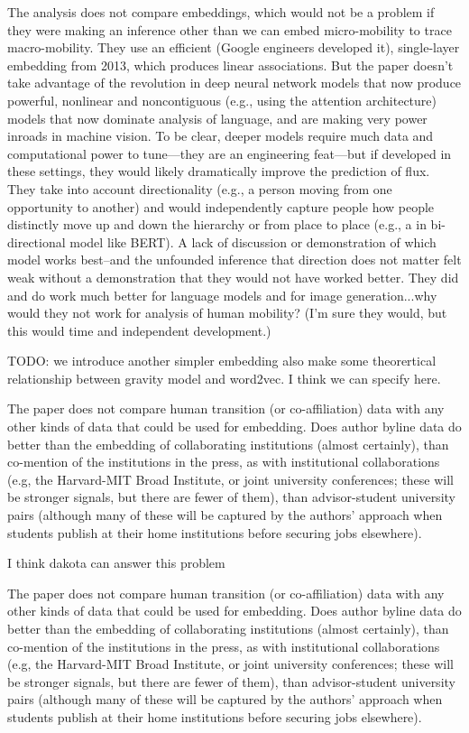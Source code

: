 \documentclass[12pt,a4paper]{article}
\newcommand{\response}[1]{{\leavevmode\noindent #1}}
\newcommand{\rcomment}[1]{%
\vspace{10pt}
\begin{tcolorbox}[colback=black!3,colframe=white!45!black]
#1
\end{tcolorbox}
}
\begin{document}
\rcomment{
The analysis does not compare embeddings, which would not be a problem if they were making
an inference other than we can embed micro-mobility to trace macro-mobility. They use an
efficient (Google engineers developed it), single-layer embedding from 2013, which produces
linear associations. But the paper doesn’t take advantage of the revolution in deep neural
network models that now produce powerful, nonlinear and noncontiguous (e.g., using the
attention architecture) models that now dominate analysis of language, and are making very
power inroads in machine vision. To be clear, deeper models require much data and computational power to tune—they are an engineering feat—but if developed in these settings, they would likely dramatically improve the prediction of flux. They take into account directionality (e.g., a person moving from one opportunity to another) and would independently capture people how people distinctly move up and down the hierarchy or from place to place (e.g., a in bi-directional model like BERT). A lack of discussion or demonstration of which model works best--and the unfounded inference that direction does not matter felt weak without a demonstration that they would not have worked better. They did and do work much better for language models and for image generation...why would they not work for analysis of human mobility? (I’m sure they would, but this would time and independent development.)

}

\response{
TODO: we introduce another simpler embedding also make some theorertical relationship between gravity model and word2vec. I think we can specify here.
}

\rcomment{
The paper does not compare human transition (or co-affiliation) data with any other kinds of
data that could be used for embedding. Does author byline data do better than the embedding
of collaborating institutions (almost certainly), than co-mention of the institutions in the press, as
with institutional collaborations (e.g, the Harvard-MIT Broad Institute, or joint university
conferences; these will be stronger signals, but there are fewer of them), than advisor-student
university pairs (although many of these will be captured by the authors’ approach when
students publish at their home institutions before securing jobs elsewhere).


}

\response{
I think dakota can answer this problem 
}

\rcomment{
The paper does not compare human transition (or co-affiliation) data with any other kinds of
data that could be used for embedding. Does author byline data do better than the embedding
of collaborating institutions (almost certainly), than co-mention of the institutions in the press, as
with institutional collaborations (e.g, the Harvard-MIT Broad Institute, or joint university
conferences; these will be stronger signals, but there are fewer of them), than advisor-student
university pairs (although many of these will be captured by the authors’ approach when
students publish at their home institutions before securing jobs elsewhere).

}
\end{document}

